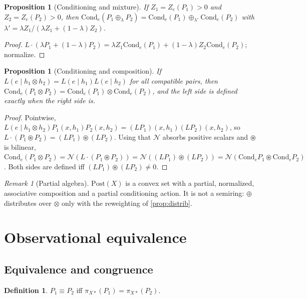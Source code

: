 \documentclass[11pt]{article}
\newtheorem{proposition}[theorem]{Proposition}
\theoremstyle{definition}
\newtheorem{definition}[theorem]{Definition}
\theoremstyle{remark}
\newtheorem{remark}[theorem]{Remark}
\newcommand{\Post}{\mathrm{Post}}
\newcommand{\Cond}{\mathrm{Cond}}
\newcommand{\N}{\mathcal{N}}
\newcommand{\cp}{\circledast}
\begin{document}
\begin{proposition}[Conditioning and mixture]
If $Z_1=Z_e(P_1)>0$ and $Z_2=Z_e(P_2)>0$, then
$\Cond_e(P_1\oplus_\lambda P_2)=\Cond_e(P_1)\oplus_{\lambda'}\Cond_e(P_2)$ with
$\lambda'=\lambda Z_1/(\lambda Z_1+(1-\lambda)Z_2)$.
\end{proposition}
\begin{proof}
$L\cdot(\lambda P_1+(1-\lambda)P_2)=\lambda Z_1\Cond_e(P_1)+(1-\lambda)Z_2\Cond_e(P_2)$; normalize.
\end{proof}

\begin{proposition}[Conditioning and composition]\label{prop:cond-comp}
If $L(e\mid h_1\otimes h_2)=L(e\mid h_1)L(e\mid h_2)$ for all compatible pairs, then
$\Cond_e(P_1\otimes P_2)=\Cond_e(P_1)\otimes\Cond_e(P_2)$, and the left side is defined exactly when
the right side is.
\end{proposition}
\begin{proof}
Pointwise, $L(e\mid h_1\otimes h_2)P_1(x,h_1)P_2(x,h_2)=(LP_1)(x,h_1)(LP_2)(x,h_2)$, so
$L\cdot(P_1\cp P_2)=(LP_1)\cp(LP_2)$. Using that $\N$ absorbs positive scalars and $\cp$ is
bilinear, $\Cond_e(P_1\otimes P_2)=\N(L\cdot(P_1\cp P_2))=\N((LP_1)\cp(LP_2))
=\N(\Cond_eP_1\cp\Cond_eP_2)$. Both sides are defined iff $(LP_1)\cp(LP_2)\ne0$.
\end{proof}

\begin{remark}[Partial algebra]
$\Post(X)$ is a convex set with a partial, normalized, associative composition and a partial
conditioning action. It is not a semiring: $\oplus$ distributes over $\otimes$ only with the
reweighting of \cref{prop:distrib}.
\end{remark}

\section{Observational equivalence}\label{sec:obs}

\subsection{Equivalence and congruence}

\begin{definition}
$P_1\equiv P_2$ iff $\pi_{X*}(P_1)=\pi_{X*}(P_2)$.
\end{definition}
\end{document}
